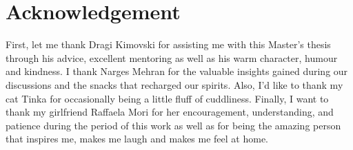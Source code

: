 \section*{Acknowledgement}
\label{sec:acknowledgement}

    First, let me thank Dragi Kimovski for assisting me with this Master's thesis through his advice, excellent mentoring as well as his warm character, humour and kindness.
    I thank Narges Mehran for the valuable insights gained during our discussions and the snacks that recharged our spirits.
    Also, I'd like to thank my cat Tinka for occasionally being a little fluff of cuddliness.
    Finally, I want to thank my girlfriend Raffaela Mori for her encouragement, understanding, and patience during the period of this work as well as for being the amazing person that inspires me, makes me laugh and makes me feel at home.